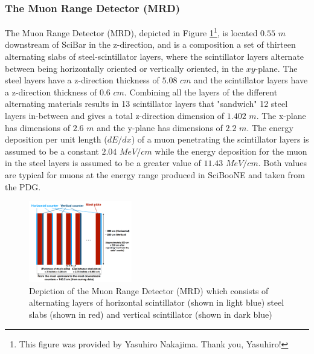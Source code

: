 \documentclass[11pt]{article}
\begin{document}
\subsubsection{The Muon Range Detector (MRD)}
\label{subsub:MRD}
The Muon Range Detector (MRD), depicted in Figure \ref*{fig:mrddetector}\footnote{This figure was provided by Yasuhiro Nakajima. Thank you, Yasuhiro!}, is located $0.55$ $m$ downstream of SciBar in the z-direction, and is a composition a set of thirteen alternating slabs of steel-scintillator layers, where the scintillator layers alternate between being horizontally oriented or vertically oriented, in the $xy$-plane. The steel layers have a z-direction thickness of $5.08$ $cm$ and the scintillator layers have a z-direction thickness of $0.6$ $cm$. Combining all the layers of the different alternating materials results in 13 scintillator layers that "sandwich" 12 steel layers in-between and gives a total z-direction dimension of $1.402$ $m$. The x-plane has dimensions of $2.6$ $m$ and the y-plane has dimensions of $2.2$ $m$. The energy deposition per unit length ($dE/dx$) of a muon penetrating the scintillator layers is assumed to be a constant $2.04$ $MeV/cm$ while the energy deposition for the muon in the steel layers is assumed to be a greater value of $11.43$ $MeV/cm$. Both values are typical for muons at the energy range produced in SciBooNE and taken from the PDG.

\begin{figure}[H]
\centering
\includegraphics[width=0.4\textwidth]{EventClassifications/mrd.png}
\caption{Depiction of the Muon Range Detector (MRD) which consists of alternating layers of horizontal scintillator (shown in light blue) steel slabs (shown in red) and vertical scintillator (shown in dark blue)}
\label{fig:mrddetector}
\end{figure}



\end{document}
